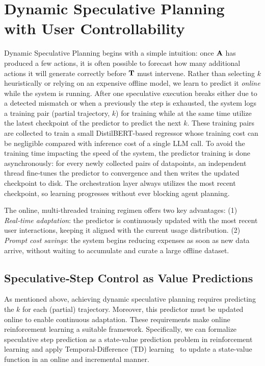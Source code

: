 \section{Dynamic Speculative Planning with User Controllability}
Dynamic Speculative Planning begins with a simple intuition: once ${\mathbf{A}}$ has produced a few actions, it is often possible to forecast how many additional actions it will generate correctly before ${\mathbf{T}}$ must intervene. Rather than selecting $k$ heuristically or relying on an expensive offline model, we learn to predict it \emph{online} while the system is running. After one speculative execution breaks either due to a detected mismatch or when a previously the step is exhausted, the system logs a training pair (partial trajectory, $k$) for training while at the same time utilize the latest checkpoint of the predictor to predict the next $k$. These training pairs are collected to train a small DistilBERT-based regressor whose training cost can be negligible compared with inference cost of a single LLM call. To avoid the training time impacting the speed of the system, the predictor training is done asynchronously: for every newly collected pairs of datapoints, an independent thread fine‑tunes the predictor to convergence and then writes the updated checkpoint to disk. The orchestration layer always utilizes the most recent checkpoint, so learning progresses without ever blocking agent planning. 

The online, multi-threaded training regimen offers two key advantages: (1) \textit{Real‑time adaptation}: the predictor is continuously updated with the most recent user interactions, keeping it aligned with the current usage distribution. (2) \textit{Prompt cost savings}: the system begins reducing expenses as soon as new data arrive, without waiting to accumulate and curate a large offline dataset.


\subsection{Speculative‑Step Control as Value Predictions}
\label{sec:spec_step_control}

As mentioned above, achieving dynamic speculative planning requires predicting the $k$ for each (partial) trajectory.
Moreover, this predictor must be updated online to enable continuous adaptation.
These requirements make online reinforcement learning a suitable framework.
Specifically, we can formalize speculative step prediction as a state-value prediction problem in reinforcement learning and apply Temporal-Difference (TD) learning~\citep{sutton2018reinforcement} to update a state-value function in an online and incremental manner.

